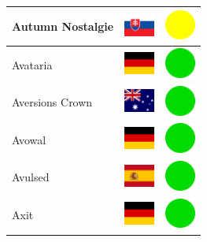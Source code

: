 \documentclass[12pt, a4paper, twoside]{report}
\begin{document}
\begin{center}
\begin{longtable}{|p{5cm}|p{2cm}|p{2cm}|}
 Autumn Nostalgie                                           & \includegraphics[width=1cm]{../4x3/sk} &   \includegraphics[width=1cm]{../likes/m} \\ \hline
 Avataria                                                   & \includegraphics[width=1cm]{../4x3/de} &   \includegraphics[width=1cm]{../likes/y} \\ \hline
 Aversions Crown                                            & \includegraphics[width=1cm]{../4x3/au} &   \includegraphics[width=1cm]{../likes/y} \\ \hline
 Avowal                                                     & \includegraphics[width=1cm]{../4x3/de} &   \includegraphics[width=1cm]{../likes/y} \\ \hline
 Avulsed                                                    & \includegraphics[width=1cm]{../4x3/es} &   \includegraphics[width=1cm]{../likes/y} \\ \hline
 Axit                                                       & \includegraphics[width=1cm]{../4x3/de} &   \includegraphics[width=1cm]{../likes/y} \\ \hline

\end{longtable}
\end{center}
\end{document}
